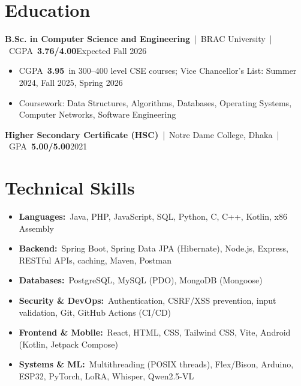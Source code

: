 \documentclass[10pt]{article}
\providecommand{\pdffakespace}{}                        %
\newcommand{\ssp}{\pdffakespace\ }                      %
\newcommand{\sep}{\ssp\textcolor{muted}{|}\ssp}                         %
\newcommand{\entry}[3]{\textbf{#1}\sep #2\pdffakespace\hfill\textcolor{muted}{#3}\par} %
\newcommand{\skill}[2]{\item \textbf{#1:}\ssp #2}
\newcommand{\gap}{\vspace{3.5pt}}
\begin{document}
\section{Education}
\entry{B.Sc. in Computer Science and Engineering}{BRAC University\sep CGPA\ssp\textbf{3.76/4.00}}{Expected Fall 2026}
\begin{itemize}
  \item CGPA\ssp\textbf{3.95}\ssp in 300--400 level CSE courses; Vice Chancellor's List: Summer 2024, Fall 2025, Spring 2026
  \item Coursework: Data Structures, Algorithms, Databases, Operating Systems, Computer Networks, Software Engineering
\end{itemize}
\gap
\entry{Higher Secondary Certificate (HSC)}{Notre Dame College, Dhaka\sep GPA\ssp\textbf{5.00/5.00}}{2021}

\section{Technical Skills}
\begin{itemize}
  \skill{Languages}{Java, PHP, JavaScript, SQL, Python, C, C++, Kotlin, x86 Assembly}
  \skill{Backend}{Spring Boot, Spring Data JPA (Hibernate), Node.js, Express, RESTful APIs, caching, Maven, Postman}
  \skill{Databases}{PostgreSQL, MySQL (PDO), MongoDB (Mongoose)}
  \skill{Security \& DevOps}{Authentication, CSRF/XSS prevention, input validation, Git, GitHub Actions (CI/CD)}
  \skill{Frontend \& Mobile}{React, HTML, CSS, Tailwind CSS, Vite, Android (Kotlin, Jetpack Compose)}
  \skill{Systems \& ML}{Multithreading (POSIX threads), Flex/Bison, Arduino, ESP32, PyTorch, LoRA, Whisper, Qwen2.5-VL}
\end{itemize}

\end{document}
